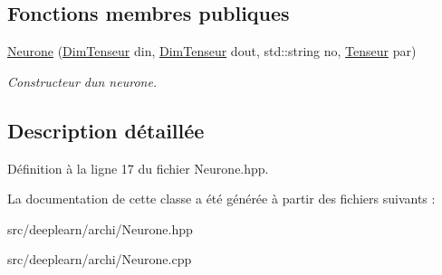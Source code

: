 \subsection*{Fonctions membres publiques}
\begin{DoxyCompactItemize}
\item 
\mbox{\label{class_neurone_af50116b497400f2b84f424854971f750}} 
\hyperlink{class_neurone_af50116b497400f2b84f424854971f750}{Neurone} (\hyperlink{class_dim_tenseur}{Dim\+Tenseur} din, \hyperlink{class_dim_tenseur}{Dim\+Tenseur} dout, std\+::string no, \hyperlink{class_tenseur}{Tenseur} par)
\begin{DoxyCompactList}\small\item\em Constructeur d\textquotesingle{}un neurone. \end{DoxyCompactList}\end{DoxyCompactItemize}


\subsection{Description détaillée}


Définition à la ligne 17 du fichier Neurone.\+hpp.



La documentation de cette classe a été générée à partir des fichiers suivants \+:\begin{DoxyCompactItemize}
\item 
src/deeplearn/archi/Neurone.\+hpp\item 
src/deeplearn/archi/Neurone.\+cpp\end{DoxyCompactItemize}
